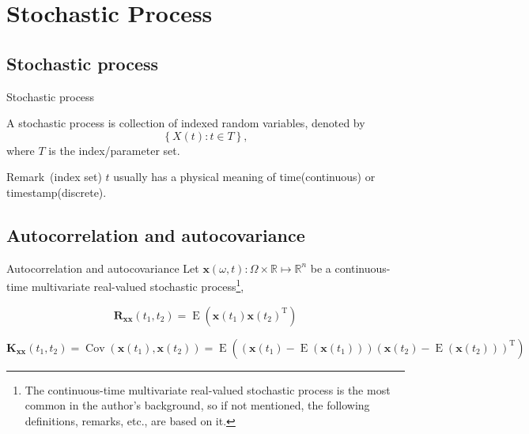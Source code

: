 \documentclass[utf-8, 10pt, aspectratio=1610]{beamer}
\begin{document}
\section{Stochastic Process}
\subsection{Stochastic process}
\begin{frame}{Stochastic process}
	\vspace*{\fill}
	\begin{definition}
		A stochastic process is collection of indexed random variables, denoted by
		\begin{equation}
			\left\{X(t): t\in T\right\},
		\end{equation}
		where \(T\) is the index/parameter set.
	\end{definition}
	\vspace*{\fill}
	\begin{block}{Remark\ (index set)}
		\(t \) usually has a physical meaning of time(continuous) or timestamp(discrete).
	\end{block}
	\vspace*{\fill}
\end{frame}

\subsection{Autocorrelation and autocovariance}
\begin{frame}{Autocorrelation and autocovariance}
	\vspace*{\fill}
	Let \(\mathbf{x}(\omega, t): \Omega\times \mathbb{R}\mapsto \mathbb{R}^n\) be a continuous-time multivariate real-valued stochastic process\footnote{The continuous-time multivariate real-valued stochastic process is the most common in the author's background, so if not mentioned, the following definitions, remarks, etc., are based on it.},
	\begin{definition}[autocorrelation]
		\begin{equation}
			\mathbf{R}_{\mathbf{x}\mathbf{x}}(t_1,t_2) = \operatorname{E}\left(\mathbf{x}(t_1) \mathbf{x}(t_2)^{\mathrm{T}}\right)
		\end{equation}
	\end{definition}
	\vspace*{\fill}
	\begin{definition}[autocovariance]
		\begin{equation}
			\mathbf{K}_{\mathbf{x}\mathbf{x}}(t_1,t_2) = \operatorname{Cov}\left(\mathbf{x}(t_1), \mathbf{x}(t_2)\right) = \operatorname{E}\left(\left(\mathbf{x}(t_1) - \operatorname{E}\left(\mathbf{x}(t_1)\right)\right)\left(\mathbf{x}(t_2) - \operatorname{E}\left(\mathbf{x}(t_2)\right)\right)^{\mathrm{T}}\right)
		\end{equation}
	\end{definition}
	\vspace*{\fill}
\end{frame}
\end{document}
